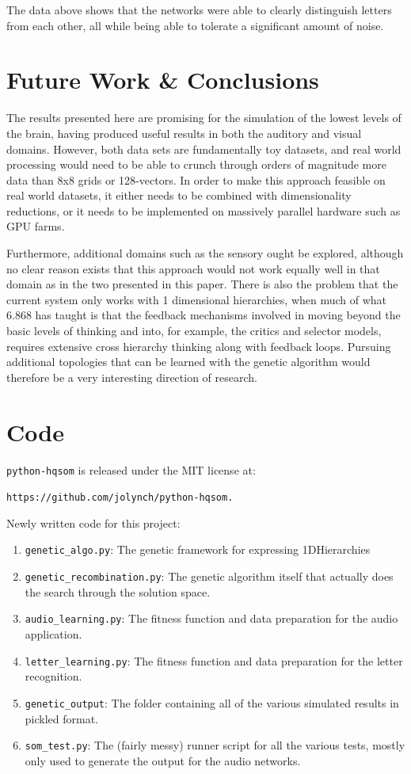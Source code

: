 \documentclass[12pt,a4paper]{article}
\begin{document}
The data above shows that the networks were able to clearly distinguish letters from each other, all while being able to tolerate a significant amount of noise.

\section{Future Work \& Conclusions}
The results presented here are promising for the simulation of the lowest levels of the brain, having produced useful results in both the auditory and visual domains.  However, both data sets are fundamentally toy datasets, and real world processing would need to be able to crunch through orders of magnitude more data than 8x8 grids or 128-vectors.  In order to make this approach feasible on real world datasets, it either needs to be combined with dimensionality reductions, or it needs to be implemented on massively parallel hardware such as GPU farms.

Furthermore, additional domains such as the sensory ought be explored, although no clear reason exists that this approach would not work equally well in that domain as in the two presented in this paper.  There is also the problem that the current system only works with 1 dimensional hierarchies, when much of what 6.868 has taught is that the feedback mechanisms involved in moving beyond the basic levels of thinking and into, for example, the critics and selector models, requires extensive cross hierarchy thinking along with feedback loops.  Pursuing additional topologies that can be learned with the genetic algorithm would therefore be a very interesting direction of research.

\section{Code}
\texttt{python-hqsom} is released under the MIT license at:

\texttt{https://github.com/jolynch/python-hqsom.}


Newly written code for this project:
\begin{enumerate}
\item \texttt{genetic\_algo.py}: The genetic framework for expressing 1DHierarchies
\item \texttt{genetic\_recombination.py}: The genetic algorithm itself that actually does the search through the solution space.
\item \texttt{audio\_learning.py}: The fitness function and data preparation for the audio application.
\item \texttt{letter\_learning.py}: The fitness function and data preparation for the letter recognition.
\item \texttt{genetic\_output}: The folder containing all of the various simulated results in pickled format.
\item \texttt{som\_test.py}: The (fairly messy) runner script for all the various tests, mostly only used to generate the output for the audio networks.
\end{enumerate}
\end{document}
